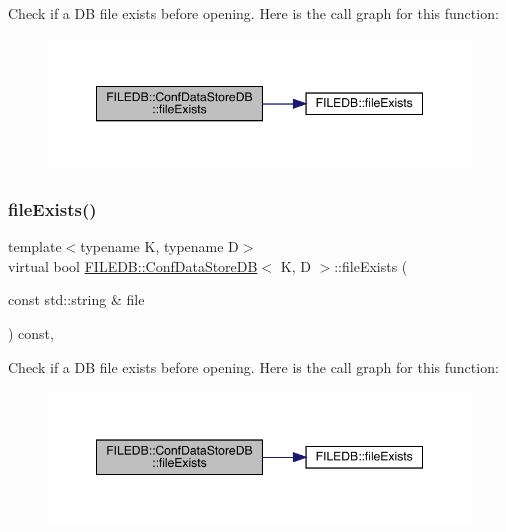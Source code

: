 Check if a DB file exists before opening. Here is the call graph for this function\+:
\nopagebreak
\begin{figure}[H]
\begin{center}
\leavevmode
\includegraphics[width=349pt]{d8/d19/classFILEDB_1_1ConfDataStoreDB_aec1d15aa66421b99e7cd1151e12d2f17_cgraph}
\end{center}
\end{figure}
\mbox{\label{classFILEDB_1_1ConfDataStoreDB_aec1d15aa66421b99e7cd1151e12d2f17}} 
\subsubsection{\texorpdfstring{fileExists()}{fileExists()}\hspace{0.1cm}{\footnotesize\ttfamily [2/3]}}
{\footnotesize\ttfamily template$<$typename K, typename D$>$ \\
virtual bool \mbox{\hyperlink{classFILEDB_1_1ConfDataStoreDB}{F\+I\+L\+E\+D\+B\+::\+Conf\+Data\+Store\+DB}}$<$ K, D $>$\+::file\+Exists (\begin{DoxyParamCaption}\item[{const std\+::string \&}]{file }\end{DoxyParamCaption}) const\hspace{0.3cm}{\ttfamily [inline]}, {\ttfamily [virtual]}}

Check if a DB file exists before opening. Here is the call graph for this function\+:
\nopagebreak
\begin{figure}[H]
\begin{center}
\leavevmode
\includegraphics[width=349pt]{d8/d19/classFILEDB_1_1ConfDataStoreDB_aec1d15aa66421b99e7cd1151e12d2f17_cgraph}
\end{center}
\end{figure}
\mbox{\label{classFILEDB_1_1ConfDataStoreDB_aec1d15aa66421b99e7cd1151e12d2f17}} 
